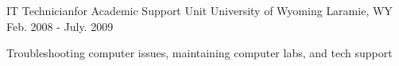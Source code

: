 \begin{cventries}
\begin{displaySection}

    \cventry
    {IT Technicianfor Academic Support Unit} %
    {University of Wyoming} %
    {Laramie, WY} %
    {Feb. 2008 - July. 2009} %
    { %
    \begin{cvitems}
    \item {Troubleshooting computer issues, maintaining computer labs, and tech support}
    \end{cvitems}
    }

\end{displaySection}

\end{cventries}
